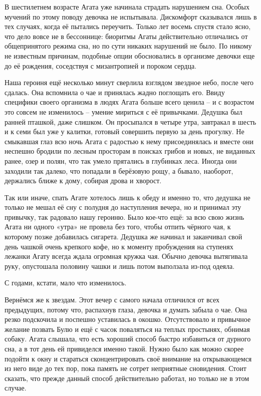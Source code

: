 \documentclass[
  a5paperpaper,
  DIV=11,
  numbers=noendperiod]{scrreprt}
\begin{document}
В шестилетнем возрасте Агата уже начинала страдать нарушением сна.
Особых мучений по этому поводу девочка не испытывала. Дискомфорт
сказывался лишь в тех случаях, когда её пытались переучить. Только лет
восемь спустя стало ясно, что дело вовсе не в бессоннице: биоритмы Агаты
действительно отличались от общепринятого режима сна, но по сути никаких
нарушений не было. По никому не известным причинам, подобные опции
обосновались в организме девочки еще до её рождения, соседствуя с
мизантропией и пороком сердца.

Наша героиня ещё несколько минут сверлила взглядом звездное небо, после
чего сдалась. Она вспомнила о чае и принялась жадно поглощать его. Ввиду
специфики своего организма в людях Агата больше всего ценила -- и с
возрастом это совсем не изменилось -- умение мириться с её привычками.
Дедушка был ранней пташкой, даже слишком. Он просыпался в четыре утра,
завтракал в шесть и к семи был уже у калитки, готовый совершить первую
за день прогулку. Не смыкавшая глаз всю ночь Агата с радостью к нему
присоединялась и вместе они неспешно бродили по лесным просторам в
поисках грибов и новых, не виданных ранее, озер и полян, что так умело
прятались в глубинках леса. Иногда они заходили так далеко, что попадали
в берёзовую рощу, а бывало, наоборот, держались ближе к дому, собирая
дрова и хворост.

Так или иначе, спать Агате хотелось лишь к обеду и именно то, что
дедушка не только не мешал её сну с полудня до наступления вечера, но и
принимал эту привычку, так радовало нашу героиню. Было кое-что ещё: за
всю свою жизнь Агата ни одного «утра» не провела без того, чтобы отпить
чёрного чая, к которому позже добавилась сигарета. Дедушка же начинал и
заканчивал свой день чашкой очень крепкого кофе, но к моменту
пробуждения на ступенях лежанки Агату всегда ждала огромная кружка чая.
Обычно девочка вытягивала руку, опустошала половину чашки и лишь потом
выползала из-под одеяла.

С годами, кстати, мало что изменилось.

Вернёмся же к звездам. Этот вечер с самого начала отличился от всех
предыдущих, потому что, распахнув глаза, девочка и думать забыла о чае.
Она резко подскочила и поспешно уставилась в окошко. Отсутствовало и
привычное желание позвать Булю и ещё с часок поваляться на теплых
простынях, обнимая собаку. Агата слышала, что есть хороший способ быстро
избавиться от дурного сна, а в тот день ей привиделся именно такой.
Нужно было как можно скорее подойти к окну и стараться сконцентрировать
своё внимание на открывающемся из него виде до тех пор, пока память не
сотрет неприятные сновидения. Стоит сказать, что прежде данный способ
действительно работал, но только не в этом случае.
\end{document}
